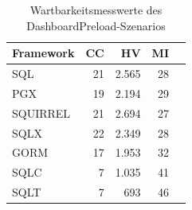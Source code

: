 \begin{table}[ht]
\centering
\caption{Wartbarkeitsmesswerte des DashboardPreload-Szenarios}
\begin{tabular}{lrrrr}
\toprule
Framework & CC & HV & MI \\
\midrule
	SQL & 21 & 2.565 & 28 \\
	PGX & 19 & 2.194 & 29 \\
	SQUIRREL & 21 & 2.694 & 27 \\
	SQLX & 22 & 2.349 & 28 \\
	GORM & 17 & 1.953 & 32 \\
	SQLC & 7 & 1.035 & 41 \\
	SQLT & 7 & 693 & 46 \\
\bottomrule
\end{tabular}
\label{tab:wartbarkeit_dashboardpreload}
\end{table}
	